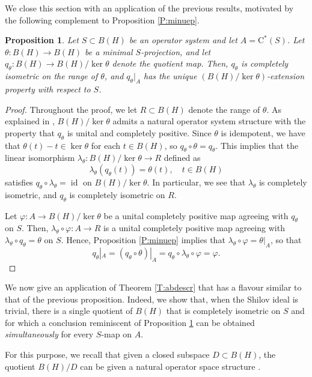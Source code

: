 \documentclass[10pt]{amsart}
\newcommand{\rC}{\mathrm{C}}
\renewcommand{\phi}{\varphi}
\newcommand{\id}{\operatorname{id}}
\newtheorem{proposition}[lemma]{Proposition}
\theoremstyle{definition}
\begin{document}
We close this section with an application of the previous results, motivated by the following complement to Proposition \ref{P:minuep}.

\begin{proposition}\label{P:quotienttight}
Let $S\subset B(H)$ be an operator system and let $A=\rC^*(S)$. Let $\theta:B(H)\to B(H)$ be a minimal $S$-projection, and let $q_\theta:B(H)\to B(H)/\ker\theta$ denote the quotient map. Then, $q_\theta$ is completely isometric on the range of $\theta$, and $q_\theta|_A$ has the  unique $(B(H)/\ker \theta)$-extension property with respect to $S$.
\end{proposition}
\begin{proof}
Throughout the proof, we let $R\subset B(H)$ denote the range of $\theta$.
As explained in \cite[Section 3]{KPTT2013}, $B(H)/\ker \theta$ admits a natural operator system structure with the property that $q_\theta$ is unital and completely positive.
Since $\theta$ is idempotent, we have that $\theta(t)-t\in \ker \theta$ for each $t\in B(H)$, so $q_\theta\circ \theta=q_\theta$.  This implies that the linear isomorphism
$\lambda_\theta:B(H)/\ker \theta\to R$ defined as
\[
\lambda_\theta(q_\theta(t))= \theta(t), \quad t\in B(H)
\]
satisfies $q_\theta\circ\lambda_\theta=\id$ on $B(H)/\ker\theta$. In particular, we see that $\lambda_\theta$ is completely isometric, and $q_\theta$ is completely isometric on $R$.

Let  $\phi:A\to B(H)/\ker \theta$ be a unital completely positive map agreeing with $q_\theta$ on $S$. Then, $\lambda_\theta\circ \phi:A\to R$ is a unital completely positive map agreeing with $\lambda_\theta\circ q_\theta=\theta$ on $S$. 
Hence, Proposition \ref{P:minuep} implies that $\lambda_\theta\circ \phi=\theta|_{A}$, so that 
\[
q_\theta|_{A}=(q_\theta\circ \theta)|_{A}=q_\theta\circ \lambda_\theta\circ \phi=\phi.
\]
\end{proof}


We now give an application of Theorem \ref{T:abdescr} that has a flavour similar to that of the previous proposition. Indeed, we show that, when the Shilov ideal is trivial, there is a single quotient of $B(H)$ that is completely isometric on $S$ and for which a conclusion reminiscent of Proposition \ref{P:quotienttight} can be obtained \emph{simultaneously} for every $S$-map on $A$.

For this purpose, we recall that given a closed subspace $D\subset B(H)$, the quotient $B(H)/D$ can be given a natural operator space structure \cite[Exercise 13.3]{paulsen2002}.
\end{document}

